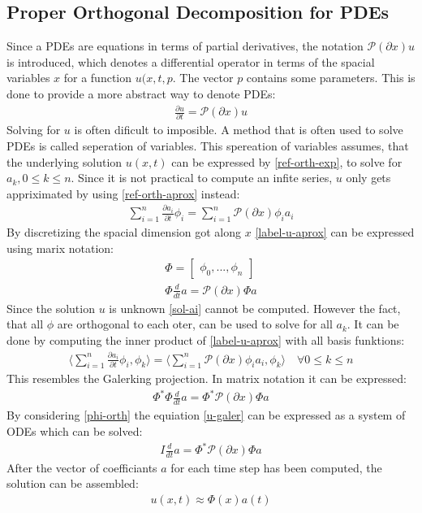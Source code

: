 \subsection{Proper Orthogonal Decomposition for PDEs}
Since a PDEs are equations in terms of partial derivatives, the notation \(\mathscr{P}(\partial x) u\) is introduced, which denotes a differential operator in terms of the spacial variables \(x\) for a function \(u(x,t,p\).
The vector \(p\) contains some parameters.
This is done to provide a more abstract way to denote PDEs:
\begin{gather}
\frac{\partial u}{\partial t} = \mathscr{P}(\partial x) u
\end{gather}
\cite{Gustafsson2011f}
Solving for \(u\) is often dificult to imposible.
A method that is often used to solve PDEs is called seperation of variables.
This spereation of variables assumes, that the underlying solution \(u(x, t)\) can be expressed by \ref{ref-orth-exp}, to solve for \(a_k, 0 \leq k \leq n\).
Since it is not practical to compute an infite series, \(u\) only gets appriximated by using \ref{ref-orth-aprox} instead:
\begin{gather}
\sum_{i = 1} ^{n} \frac{\partial a_i}{\partial t} \phi_i = \sum_{i = 1} ^{n} \mathscr{P}(\partial x) \phi_i a_i \label{label-u-aprox} 
\end{gather}
By discretizing the spacial dimension got along \(x\) \ref{label-u-aprox} can be expressed using marix notation:
\begin{gather}
\Phi = \begin{bmatrix}
\phi_0, ..., \phi_n
\end{bmatrix} \label{mat-phi}\\
\Phi \frac{d}{dt}a = \mathscr{P}(\partial x) \Phi a
\end{gather}
Since the solution \(u\) is unknown \ref{sol-ai} cannot be computed.
However the fact, that all \(\phi\) are orthogonal to each oter, can be used to solve for all \(a_k\).
It can be done by computing the inner product of \ref{label-u-aprox} with all basis funktions:
\begin{gather}
\langle \sum_{i = 1} ^{n} \frac{\partial a_i}{\partial t} \phi_i, \phi_k \rangle = \langle\sum_{i = 1} ^{n} \mathscr{P}(\partial x) \phi_i a_i, \phi_k \rangle \quad \forall 0 \leq k \leq n \label{u-galer}
\end{gather}
This resembles the Galerking projection.
In matrix notation it can be expressed:
\begin{gather}
\Phi^{*}\Phi \frac{d}{dt}a = \Phi^{*}\mathscr{P}(\partial x) \Phi a
\end{gather}
By considering \ref{phi-orth}  the equiation \ref{u-galer} can be expressed as a system of ODEs which can be solved:
\begin{gather}
I \frac{d}{dt} a = \Phi^{*}\mathscr{P}(\partial x) \Phi a
\end{gather}
After the vector of coefficiants \(a\) for each time step has been computed, the solution can be assembled:
\begin{gather}
u(x, t) \approx \Phi(x)a(t)
\end{gather} 
\cite{brunton_kutz_2019c}
